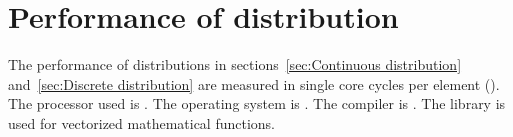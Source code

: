 %
%
%
%

\chapter{Performance of distribution}
\label{chap:Performance of distribution}

The performance of distributions in sections~\ref{sec:Continuous distribution}
and~\ref{sec:Discrete distribution} are measured in single core cycles per
element (\cpe). The processor used is \cpuversion. The operating system is
\osversion. The compiler is \llvmversion. The \mkl library is used for
vectorized mathematical functions.


